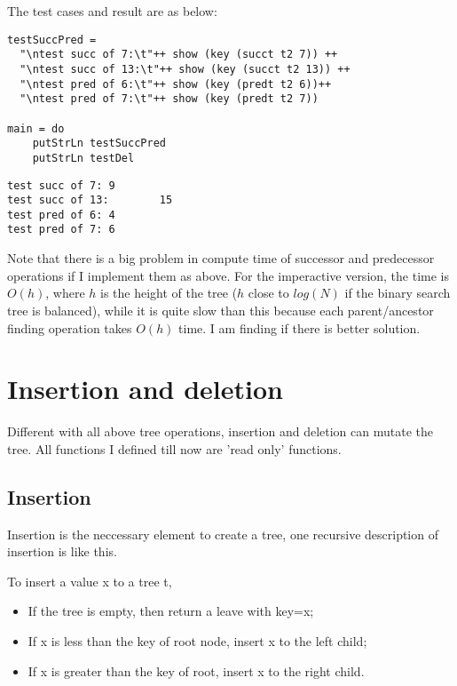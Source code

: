 \documentclass{article}
\begin{document}
The test cases and result are as below:
\begin{lstlisting}
testSuccPred = 
  "\ntest succ of 7:\t"++ show (key (succt t2 7)) ++
  "\ntest succ of 13:\t"++ show (key (succt t2 13)) ++
  "\ntest pred of 6:\t"++ show (key (predt t2 6))++
  "\ntest pred of 7:\t"++ show (key (predt t2 7))

main = do
    putStrLn testSuccPred
    putStrLn testDel
\end{lstlisting}

\begin{verbatim}
test succ of 7: 9
test succ of 13:        15
test pred of 6: 4
test pred of 7: 6
\end{verbatim}

Note that there is a big problem in compute time of successor and predecessor 
operations if I implement them as above. For the imperactive version, the time
is $O(h)$, where $h$ is the height of the tree ($h$ close to $log(N)$ if the
binary search tree is balanced), while it is quite slow than this because each
parent/ancestor finding operation takes $O(h)$ time. I am finding if there is 
better solution.

\section{Insertion and deletion}

Different with all above tree operations, insertion and deletion can mutate
the tree. All functions I defined till now are 'read only' functions.

\subsection{Insertion}
Insertion is the neccessary element to create a tree, one recursive description
of insertion is like this.

To insert a value x to a tree t,
\begin{itemize}
\item If the tree is empty, then return a leave with key=x;
\item If x is less than the key of root node, insert x to the left child;
\item If x is greater than the key of root, insert x to the right child.
\end{itemize}
\end{document}
